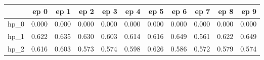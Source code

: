 \begin{tabular}{lrrrrrrrrrr}
\toprule
{} &   ep 0 &   ep 1 &   ep 2 &   ep 3 &   ep 4 &   ep 5 &   ep 6 &   ep 7 &   ep 8 &   ep 9 \\
\midrule
hp\_0 &  0.000 &  0.000 &  0.000 &  0.000 &  0.000 &  0.000 &  0.000 &  0.000 &  0.000 &  0.000 \\
hp\_1 &  0.622 &  0.635 &  0.630 &  0.603 &  0.614 &  0.616 &  0.649 &  0.561 &  0.622 &  0.649 \\
hp\_2 &  0.616 &  0.603 &  0.573 &  0.574 &  0.598 &  0.626 &  0.586 &  0.572 &  0.579 &  0.574 \\
\bottomrule
\end{tabular}
